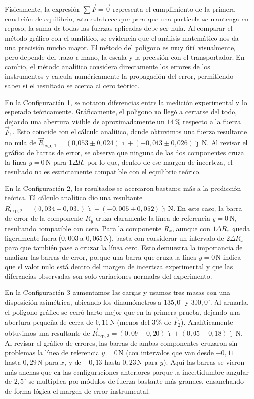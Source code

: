 \documentclass[12pt,a4paper]{article}
\newcommand{\uveci}{\hat{\imath}} %
\newcommand{\uvecj}{\hat{\jmath}} %
\begin{document}
Físicamente, la expresión $\sum \vec{F} = \vec{0}$ representa el cumplimiento de la primera condición de equilibrio, esto establece que para que una partícula se mantenga en reposo, la suma de todas las fuerzas aplicadas debe ser nula. Al comparar el método gráfico con el analítico, se evidencia que el análisis matemático nos da una precisión mucho mayor. El método del polígono es muy útil visualmente, pero depende del trazo a mano, la escala y la precisión con el transportador. En cambio, el método analítico considera directamente los errores de los instrumentos y calcula numéricamente la propagación del error, permitiendo saber si el resultado se acerca al cero teórico.

En la Configuración 1, se notaron diferencias entre la medición experimental y lo esperado teóricamente. Gráficamente, el polígono no llegó a cerrarse del todo, dejando una abertura visible de aproximadamente un $14\,\%$ respecto a la fuerza $\vec{F}_1$. Esto coincide con el cálculo analítico, donde obtuvimos una fuerza resultante no nula de $\vec{R}_{\text{exp, 1}} = (0{,}053 \pm 0{,}024)\,\uveci + (-0{,}043 \pm 0{,}026)\,\uvecj\,\mathrm{N}$. Al revisar el gráfico de barras de error, se observa que ninguna de las dos componentes cruza la línea $y = 0\,\mathrm{N}$ para $1\Delta R$, por lo que, dentro de ese margen de incerteza, el resultado no es estrictamente compatible con el equilibrio teórico.

En la Configuración 2, los resultados se acercaron bastante más a la predicción teórica. El cálculo analítico dio una resultante $\vec{R}_{\text{exp, 2}} = (0{,}034 \pm 0{,}031)\,\uveci + (-0{,}005 \pm 0{,}052)\,\uvecj\,\mathrm{N}$. En este caso, la barra de error de la componente $R_y$ cruza claramente la línea de referencia $y = 0\,\mathrm{N}$, resultando compatible con cero. Para la componente $R_x$, aunque con $1\Delta R_x$ queda ligeramente fuera ($0{,}003$ a $0{,}065\,\mathrm{N}$), basta con considerar un intervalo de $2\Delta R_x$ para que también pase a cruzar la línea cero. Esto demuestra la importancia de analizar las barras de error, porque una barra que cruza la línea $y = 0\,\mathrm{N}$ indica que el valor nulo está dentro del margen de incerteza experimental y que las diferencias observadas son solo variaciones normales del experimento.

En la Configuración 3 aumentamos las cargas y usamos tres masas con una disposición asimétrica, ubicando los dinamómetros a $135{,}0^\circ$ y $300{,}0^\circ$. Al armarla, el polígono gráfico se cerró harto mejor que en la primera prueba, dejando una abertura pequeña de cerca de $0{,}11\,\mathrm{N}$ (menos del $3\,\%$ de $\vec{F}_2$). Analíticamente obtuvimos una resultante de $\vec{R}_{\mathrm{exp, 3}} = (0{,}09 \pm 0{,}20)\,\uveci + (0{,}05 \pm 0{,}18)\,\uvecj\,\mathrm{N}$. Al revisar el gráfico de errores, las barras de ambas componentes cruzaron sin problemas la línea de referencia $y = 0\,\mathrm{N}$ (con intervalos que van desde $-0{,}11$ hasta $0{,}29\,\mathrm{N}$ para $x$, y de $-0{,}13$ hasta $0{,}23\,\mathrm{N}$ para $y$). Aquí las barras se vieron más anchas que en las configuraciones anteriores porque la incertidumbre angular de $2{,}5^\circ$ se multiplica por módulos de fuerza bastante más grandes, ensanchando de forma lógica el margen de error instrumental.
\end{document}
